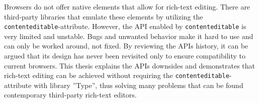 Browsers do not offer native elements that allow for rich-text editing. There are third-party libraries that emulate these elements by utilizing the \texttt{contenteditable}-attribute. However, the API enabled by \texttt{contenteditable} is very limited and unstable. Bugs and unwanted behavior make it hard to use and can only be worked around, not fixed. By reviewing the APIs history, it can be argued that its design has never been revisited only to ensure compatibility to current browsers. This thesis explains the APIs downsides and demonstrates that rich-text editing can be achieved without requiring the \texttt{contenteditable}-attribute with library ''Type'', thus solving many problems that can be found contemporary third-party rich-text editors.


